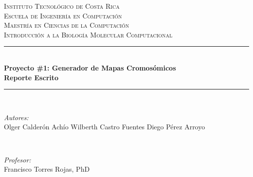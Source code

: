 
\begin{titlepage}

\newcommand{\HRule}{\rule{\linewidth}{0.5mm}} %

\center %
 

\textsc{\LARGE Instituto Tecnológico de Costa Rica}\\[1.5cm] %
\textsc{\Large Escuela de Ingeniería en Computación}\\[0.7cm] %
\textsc{\large Maestría en Ciencias de la Computación}\\[0.7cm] %
\textsc{\large Introducción a la Biología Molecular Computacional}\\[0.7cm]


\HRule \\[0.4cm]
{ \huge \bfseries Proyecto \#1: Generador de Mapas Cromosómicos}\\[0.4cm] %
{ \huge \bfseries Reporte Escrito}\\[0.4cm] %
\HRule \\[1.5cm]
 

\begin{minipage}{0.4\textwidth}
\begin{flushleft} \large
\emph{Autores:}\\
Olger Calderón Achío \linebreak
Wilberth Castro Fuentes \linebreak
Diego Pérez Arroyo 
\end{flushleft}
\end{minipage}
~
\begin{minipage}{0.4\textwidth}
\begin{flushright} \large
\emph{Profesor:} \\
Francisco Torres Rojas, PhD %
\end{flushright}
\end{minipage}\\[2cm]


\end{titlepage}
